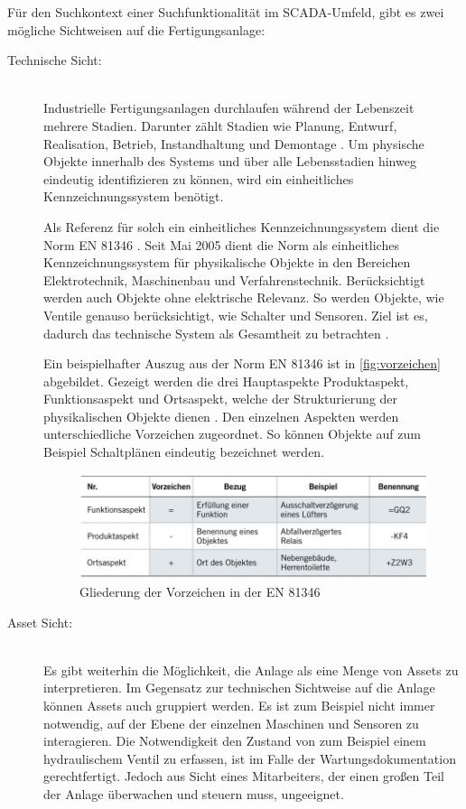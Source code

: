 Für den Suchkontext einer Suchfunktionalität im SCADA-Umfeld, gibt es zwei mögliche Sichtweisen auf die Fertigungsanlage:

\begin{description}
    \item[Technische Sicht:]\hfill \\
    Industrielle Fertigungsanlagen durchlaufen während der Lebenszeit mehrere Stadien. Darunter zählt Stadien wie Planung, Entwurf, Realisation, Betrieb, Instandhaltung und Demontage \cite{StefanSchwarzwalder.2019}. Um physische Objekte innerhalb des Systems und über alle Lebensstadien hinweg eindeutig identifizieren zu können, wird ein einheitliches Kennzeichnungssystem benötigt.

    Als Referenz für solch ein einheitliches Kennzeichnungssystem dient die Norm \glqq EN 81346\grqq{} \cite{StefanSchwarzwalder.2019}. Seit Mai 2005 dient die Norm als einheitliches Kennzeichnungssystem für physikalische Objekte in den Bereichen Elektrotechnik, Maschinenbau und Verfahrenstechnik. Berücksichtigt werden auch Objekte ohne elektrische Relevanz. So werden Objekte, wie Ventile genauso berücksichtigt, wie Schalter und Sensoren. Ziel ist es, dadurch das technische System als Gesamtheit zu betrachten \cite{StefanSchwarzwalder.2019}.

    Ein beispielhafter Auszug aus der Norm \glqq EN 81346\grqq{} ist in \autoref{fig:vorzeichen} abgebildet. Gezeigt werden die drei Hauptaspekte \glqq Produktaspekt\grqq{}, \glqq Funktionsaspekt\grqq{} und \glqq Ortsaspekt\grqq{}, welche der Strukturierung der physikalischen Objekte dienen \cite{StefanSchwarzwalder.2019}. Den einzelnen Aspekten werden unterschiedliche Vorzeichen zugeordnet. So können Objekte auf zum Beispiel Schaltplänen eindeutig bezeichnet werden.
    
    \begin{figure}[H]
        \centering
        \includegraphics[width=0.8\linewidth]{images/vorzeichen.png}
        \caption{Gliederung der Vorzeichen in der EN 81346 \cite{StefanSchwarzwalder.2019}}
        \label{fig:vorzeichen}
    \end{figure}

    \item[Asset Sicht:]\hfill \\
    Es gibt weiterhin die Möglichkeit, die Anlage als eine Menge von \glqq Assets\grqq{} zu interpretieren. Im Gegensatz zur technischen Sichtweise auf die Anlage können Assets auch gruppiert werden. Es ist zum Beispiel nicht immer notwendig, auf der Ebene der einzelnen Maschinen und Sensoren zu interagieren. Die Notwendigkeit den Zustand von zum Beispiel einem hydraulischem Ventil zu erfassen, ist im Falle der Wartungsdokumentation gerechtfertigt. Jedoch aus Sicht eines Mitarbeiters, der einen großen Teil der Anlage überwachen und steuern muss, ungeeignet.


\end{description}
